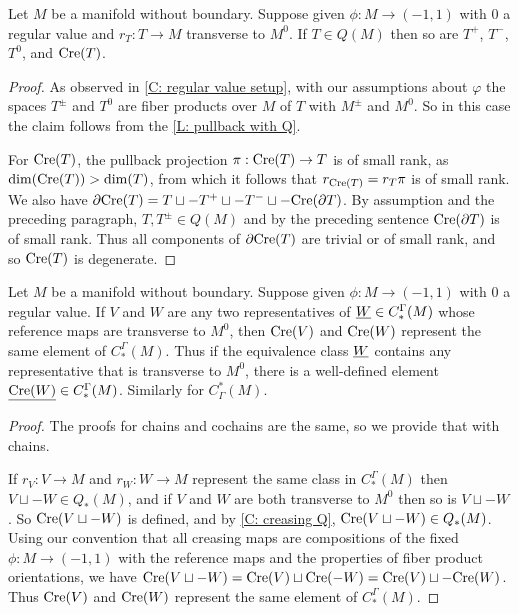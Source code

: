 \begin{corollary}\label{C: creasing Q}
Let $M$ be a manifold without boundary. Suppose given $\phi \colon M \to (-1,1)$ with $0$ a regular value and $r_T:T \to M$ transverse to $M^0$. If $T \in Q(M)$ then so are $T^+$, $T^-$, $T^0$, and $\mathrm{Cre}(T)$.
\end{corollary}
\begin{proof}
As observed in \cref{C: regular value setup}, with our assumptions about $\varphi$ the spaces $T^\pm$ and $T^0$ are fiber products over $M$ of $T$ with $M^\pm$ and $M^0$. So in this case the claim follows from the \cref{L: pullback with Q}.

For $\mathrm{Cre}(T)$, the pullback projection $\pi:\mathrm{Cre}(T) \to T$ is of small rank, as $\dim(\mathrm{Cre}(T))>\dim(T)$, from which it follows that $r_{\mathrm{Cre}(T)} = r_T\pi$ is of small rank. We also have $\partial \mathrm{Cre}(T) = T\sqcup - T^+\sqcup -T^-\sqcup -\mathrm{Cre}(\partial T)$. By assumption and the preceding paragraph, $T, T^\pm \in Q(M)$ and by the preceding sentence $\mathrm{Cre}(\partial T)$ is of small rank. Thus all components of $\partial \mathrm{Cre}(T)$ are trivial or of small rank, and so $\mathrm{Cre}(T)$ is degenerate.
\end{proof}

\begin{proposition}
Let $M$ be a manifold without boundary. Suppose given $\phi \colon M \to (-1,1)$ with $0$ a regular value. If $V$ and $W$ are any two representatives of $\underline{W} \in C_*^\Gamma(M)$ whose reference maps are transverse to $M^0$, then $\mathrm{Cre}(V)$ and $\mathrm{Cre}(W)$ represent the same element of $C_*^\Gamma(M)$. Thus if the equivalence class $\underline{W}$ contains any representative that is transverse to $M^0$, there is a well-defined element $\underline{\mathrm{Cre}(W)} \in C_*^\Gamma(M)$. Similarly for $C^*_\Gamma(M)$.
\end{proposition}
\begin{proof}
The proofs for chains and cochains are the same, so we provide that with chains.

If $r_V \colon V \to M$ and $r_W \colon W \to M$ represent the same class in $C_*^\Gamma(M)$ then $V\sqcup -W \in Q_*(M)$, and if $V$ and $W$ are both transverse to $M^0$ then so is $V\sqcup -W$. So $\mathrm{Cre}(V\sqcup-W)$ is defined, and by \cref{C: creasing Q}, $\mathrm{Cre}(V\sqcup -W) \in Q_*(M)$. Using our convention that all creasing maps are compositions of the fixed $\phi \colon M \to (-1,1)$ with the reference maps and the properties of fiber product orientations, we have $\mathrm{Cre}(V\sqcup -W) = \mathrm{Cre}(V)\sqcup \mathrm{Cre}(-W) = \mathrm{Cre}(V)\sqcup -\mathrm{Cre}(W)$. Thus $\mathrm{Cre}(V)$ and $\mathrm{Cre}(W)$ represent the same element of $C_*^\Gamma(M)$.
\end{proof}

